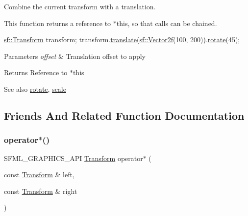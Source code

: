 Combine the current transform with a translation. 

This function returns a reference to $\ast$this, so that calls can be chained. 
\begin{DoxyCode}
\hyperlink{classsf_1_1_transform}{sf::Transform} transform;
transform.\hyperlink{classsf_1_1_transform_ab54f6c8070cc05e2afcb3145fbf4395a}{translate}(\hyperlink{classsf_1_1_vector2}{sf::Vector2f}(100, 200)).\hyperlink{classsf_1_1_transform_a3e548c3c9e3fb9d4bd43cf852669e555}{rotate}(45);
\end{DoxyCode}



\begin{DoxyParams}{Parameters}
{\em offset} & Translation offset to apply\\
\hline
\end{DoxyParams}
\begin{DoxyReturn}{Returns}
Reference to $\ast$this
\end{DoxyReturn}
\begin{DoxySeeAlso}{See also}
\hyperlink{classsf_1_1_transform_a3e548c3c9e3fb9d4bd43cf852669e555}{rotate}, \hyperlink{classsf_1_1_transform_a3f46af807f69d74120fb836334268671}{scale} 
\end{DoxySeeAlso}


\subsection{Friends And Related Function Documentation}
\mbox{\label{classsf_1_1_transform_a423ade8d6aa1378c695f8eb4bfce8981}} 
\subsubsection{\texorpdfstring{operator$\ast$()}{operator*()}\hspace{0.1cm}{\footnotesize\ttfamily [1/2]}}
{\footnotesize\ttfamily S\+F\+M\+L\+\_\+\+G\+R\+A\+P\+H\+I\+C\+S\+\_\+\+A\+PI \hyperlink{classsf_1_1_transform}{Transform} operator$\ast$ (\begin{DoxyParamCaption}\item[{const \hyperlink{classsf_1_1_transform}{Transform} \&}]{left,  }\item[{const \hyperlink{classsf_1_1_transform}{Transform} \&}]{right }\end{DoxyParamCaption})\hspace{0.3cm}{\ttfamily [related]}}



